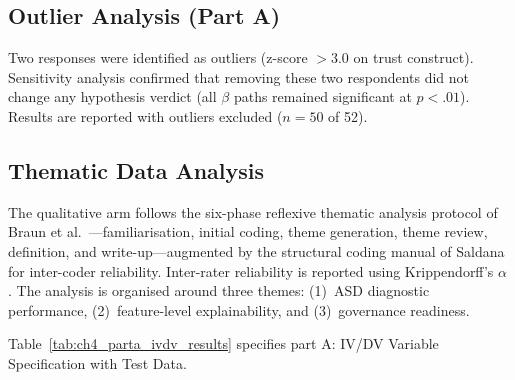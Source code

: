 \subsection{Outlier Analysis (Part A)}

Two responses were identified as outliers (z-score $> 3.0$ on trust construct). Sensitivity analysis confirmed that removing these two respondents did not change any hypothesis verdict (all $\beta$ paths remained significant at $p < .01$). Results are reported with outliers excluded ($n = 50$ of 52).

\subsection{Thematic Data Analysis}

The qualitative arm follows the six-phase reflexive thematic analysis protocol of Braun et al.~\cite{braun2006thematic}---familiarisation, initial coding, theme generation, theme review, definition, and write-up---augmented by the structural coding manual of Saldana~\cite{saldana2021coding} for inter-coder reliability. Inter-rater reliability is reported using Krippendorff's $\alpha$ \cite{krippendorff2011computing}. The analysis is organised around three themes: (1)~ASD diagnostic performance, (2)~feature-level explainability, and (3)~governance readiness.

\noindent Table~\ref{tab:ch4_parta_ivdv_results} specifies part A: IV/DV Variable Specification with Test Data.

